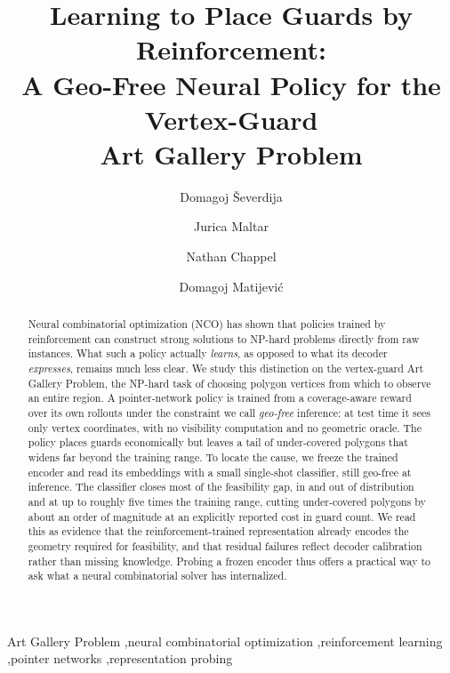 \documentclass[preprint,10pt]{elsarticle}
\begin{document}
\begin{frontmatter}

\title{Learning to Place Guards by Reinforcement:\\
A Geo-Free Neural Policy for the Vertex-Guard\\
Art Gallery Problem}

\author[osijek]{Domagoj Ševerdija}
\author[osijek]{Jurica Maltar}
\author[]{Nathan Chappel}
\author[osijek]{Domagoj Matijević}

\address[osijek]{School of Applied Mathematics and Informatics,
  University J.~J.~Strossmayer of Osijek, Croatia}

\begin{abstract}
Neural combinatorial optimization (NCO) has shown that policies trained by reinforcement can construct strong solutions to NP-hard problems directly from raw instances. What such a policy actually \emph{learns}, as opposed to what its decoder \emph{expresses}, remains much less clear. We study this distinction on the vertex-guard Art Gallery Problem, the NP-hard task of choosing polygon vertices from which to observe an entire region. A pointer-network policy is trained from a coverage-aware reward over its own rollouts under the constraint we call \emph{geo-free} inference: at test time it sees only vertex coordinates, with no visibility computation and no geometric oracle. The policy places guards economically but leaves a tail of under-covered polygons that widens far beyond the training range. To locate the cause, we freeze the trained encoder and read its embeddings with a small single-shot classifier, still geo-free at inference. The classifier closes most of the feasibility gap, in and out of distribution and at up to roughly five times the training range, cutting under-covered polygons by about an order of magnitude at an explicitly reported cost in guard count. We read this as evidence that the reinforcement-trained representation already encodes the geometry required for feasibility, and that residual failures reflect decoder calibration rather than missing knowledge. Probing a frozen encoder thus offers a practical way to ask what a neural combinatorial solver has internalized.
\end{abstract}

\begin{keyword}
Art Gallery Problem \sep neural combinatorial optimization \sep reinforcement learning \sep pointer networks \sep representation probing 
\end{keyword}

\end{frontmatter}
\end{document}

